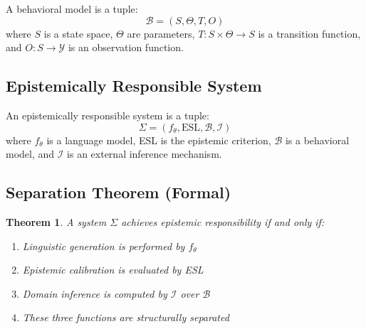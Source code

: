 \documentclass[11pt,a4paper]{article}
\newtheorem{theorem}{Theorem}[section]
\begin{document}
A behavioral model is a tuple:
\[
\mathcal{B} = (S, \Theta, T, O)
\]
where $S$ is a state space, $\Theta$ are parameters, $T: S \times \Theta \rightarrow S$ is a transition function, and $O: S \rightarrow \mathcal{Y}$ is an observation function.

\subsection{Epistemically Responsible System}

An epistemically responsible system is a tuple:
\[
\Sigma = (f_\theta, \text{ESL}, \mathcal{B}, \mathcal{I})
\]
where $f_\theta$ is a language model, ESL is the epistemic criterion, $\mathcal{B}$ is a behavioral model, and $\mathcal{I}$ is an external inference mechanism.

\subsection{Separation Theorem (Formal)}

\begin{theorem}
A system $\Sigma$ achieves epistemic responsibility if and only if:
\begin{enumerate}
    \item Linguistic generation is performed by $f_\theta$
    \item Epistemic calibration is evaluated by ESL
    \item Domain inference is computed by $\mathcal{I}$ over $\mathcal{B}$
    \item These three functions are structurally separated
\end{enumerate}
\end{theorem}
\end{document}
